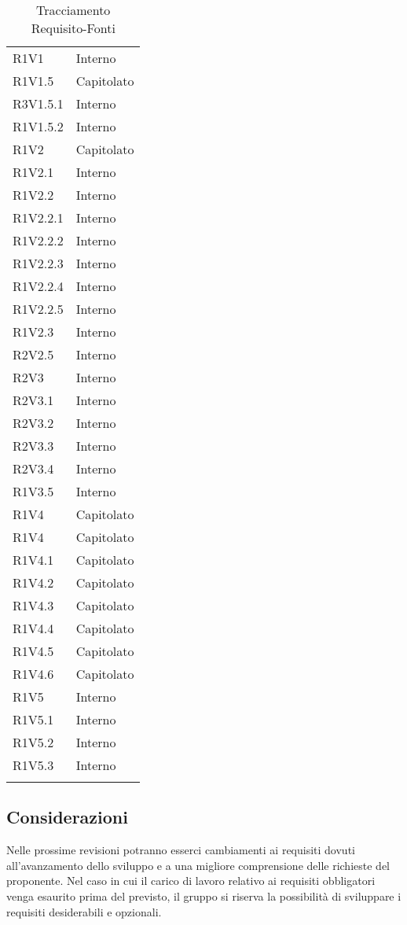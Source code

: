 \begin{longtable} {
			>{\centering}p{28mm}  
			>{}p{20mm}
		}
		R1V1 & Interno \TBstrut \\ [2mm]
		R1V1.5 & Capitolato \TBstrut \\ [2mm]
		R3V1.5.1 & Interno \TBstrut \\ [2mm]
		R1V1.5.2 & Interno \TBstrut \\ [2mm]
		R1V2 & Capitolato \TBstrut \\ [2mm]
		R1V2.1 & Interno \TBstrut \\ [2mm]
		R1V2.2 & Interno \TBstrut \\ [2mm]
		R1V2.2.1 & Interno \TBstrut \\ [2mm]
		R1V2.2.2 & Interno \TBstrut \\ [2mm]
		R1V2.2.3 & Interno \TBstrut \\ [2mm]
		R1V2.2.4 & Interno \TBstrut \\ [2mm]
		R1V2.2.5 & Interno \TBstrut \\ [2mm]
		R1V2.3 & Interno \TBstrut \\ [2mm]
		R2V2.5 & Interno \TBstrut \\ [2mm]
		R2V3 & Interno \TBstrut \\ [2mm]
		R2V3.1 & Interno \TBstrut \\ [2mm]
		R2V3.2 & Interno \TBstrut \\ [2mm]
		R2V3.3 & Interno \TBstrut \\ [2mm]
		R2V3.4 & Interno \TBstrut \\ [2mm]
		R1V3.5 & Interno \TBstrut \\ [2mm]
		R1V4 & Capitolato \TBstrut \\ [2mm]
		R1V4 & Capitolato \TBstrut \\ [2mm]
		R1V4.1 & Capitolato \TBstrut \\ [2mm]
		R1V4.2 & Capitolato \TBstrut \\ [2mm]
		R1V4.3 & Capitolato \TBstrut \\ [2mm]
		R1V4.4 & Capitolato \TBstrut \\ [2mm]
		R1V4.5 & Capitolato \TBstrut \\ [2mm]
		R1V4.6 & Capitolato \TBstrut \\ [2mm]
		R1V5 & Interno \TBstrut \\ [2mm]
		R1V5.1 & Interno \TBstrut \\ [2mm]
		R1V5.2 & Interno \TBstrut \\ [2mm]
		R1V5.3 & Interno \TBstrut \\ [2mm]
		\rowcolor{white}
		\caption{Tracciamento Requisito-Fonti}
	\end{longtable}
	\subsection{Considerazioni}
	Nelle prossime revisioni potranno esserci cambiamenti ai requisiti dovuti all'avanzamento dello sviluppo e a una migliore comprensione delle richieste del proponente. Nel caso in cui il carico di lavoro relativo ai requisiti obbligatori venga esaurito prima del previsto, il gruppo si riserva la possibilità di sviluppare i requisiti desiderabili e opzionali.